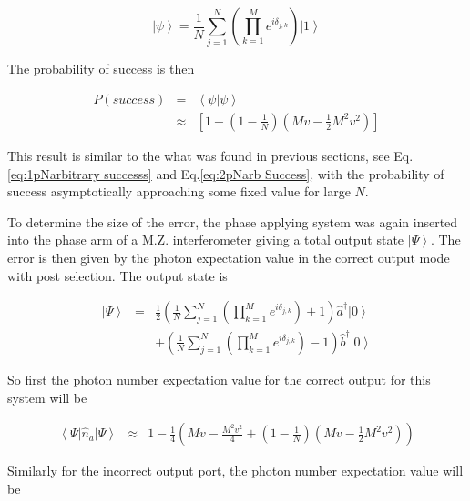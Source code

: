 \documentclass[aps,pra,twocolumn,superscriptaddress,numerical]{revtex4-1}
\begin{document}
		\begin{equation}
		\left|\psi\right\rangle =\frac{1}{N}\sum_{j=1}^{N}\left(\prod_{k=1}^{M}e^{i\delta_{j,k}}\right)\left|1\right\rangle \label{eq:AvEndPhaseState}
		\end{equation}
		
		
		The probability of success is then
		
		\begin{eqnarray}
		P\left(success\right) & = & \left\langle \psi|\psi\right\rangle \nonumber \\
		& \approx & \left[1-\left(1-\frac{1}{N}\right)\left(Mv-\frac{1}{2}M^{2}v^{2}\right)\right]\label{eq:AveEndProbSuccess}
		\end{eqnarray}
		
		
		This result is similar to the what was found in previous sections, see Eq.\ref{eq:1pNarbitrary successs} and Eq.\ref{eq:2pNarb Success}, with the probability of success asymptotically approaching some fixed value for large $N$.
		
		To determine the size of the error, the phase applying system was again inserted into the phase arm of a M.Z. interferometer giving a total output state $\left|\Psi\right\rangle $. The error is then given by the photon expectation value in the correct output mode with post selection. The output state is
		
		\begin{eqnarray}
		\left|\Psi\right\rangle & = &\frac{1}{2}\left(\frac{1}{N}\sum_{j=1}^{N}\left(\prod_{k=1}^{M}e^{i\delta_{j,k}}\right)+1\right)\hat{a}^{\dagger}\left|0\right\rangle \\ & & +\left(\frac{1}{N}\sum_{j=1}^{N}\left(\prod_{k=1}^{M}e^{i\delta_{j,k}}\right)-1\right)\hat{b}^{\dagger}\left|0\right\rangle \label{eq:AveEndIntState}
		\end{eqnarray}
		
		
		So first the photon number expectation value for the correct output for this system will be
		
		\begin{widetext}
			\begin{eqnarray}
			\left\langle \Psi\right|\hat{n}_{a}\left|\Psi\right\rangle  
			& \approx & 1-\frac{1}{4}\left(Mv-\frac{M^{2}v^{2}}{4}+\left(1-\frac{1}{N}\right)\left(Mv-\frac{1}{2}M^{2}v^{2}\right)\right)
			\end{eqnarray}
		\end{widetext}	
		
		Similarly for the incorrect output port, the photon number expectation value will be
		
\end{document}
